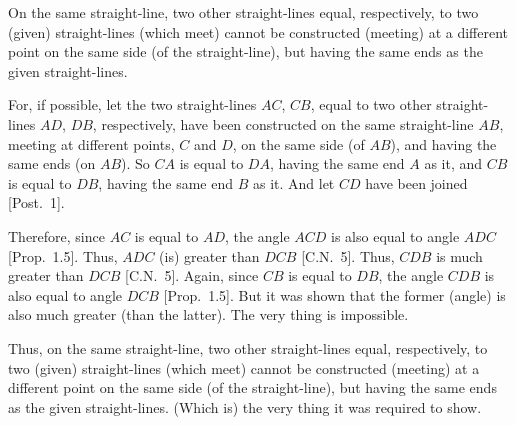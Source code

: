 \begin{Parallel}{}{}
{On the same straight-line, two other straight-lines 
equal, respectively, to 
two (given) straight-lines (which meet) cannot be constructed (meeting)
at  a different point on the same
side (of the straight-line), but having the same ends as the given straight-lines.

\epsfysize=1.5in
\centerline{}

For, if possible, let the two straight-lines $AC$, $CB$, equal to two other straight-lines $AD$, $DB$, respectively, have been constructed
on the same straight-line $AB$, meeting at different points, $C$ and $D$, on the
same side (of $AB$), and having the same ends (on $AB$). So $CA$ is equal to $DA$, having the same end $A$ as it, and $CB$ is equal to $DB$, having the
same end $B$ as it. And let $CD$ have been joined [Post.~1].

Therefore, since $AC$ is equal to $AD$,  the angle $ACD$ is also equal to angle $ADC$ [Prop.~1.5].
Thus, $ADC$ (is) greater than $DCB$ [C.N.~5]. Thus, $CDB$ is much greater
than $DCB$ [C.N.~5]. Again, since  $CB$ is equal to $DB$, the angle $CDB$ is also equal to
angle $DCB$ [Prop.~1.5]. But it was shown that the former (angle) is also much
greater (than the latter). The very thing is impossible.

Thus, on the same straight-line, two other straight-lines equal, respectively, to  
two (given) straight-lines  (which meet) cannot be constructed (meeting)
at a different point on the same
side (of the straight-line), but having the same ends as the given straight-lines.
(Which is) the very thing it was required to show.}
\end{Parallel}

